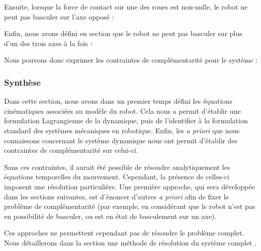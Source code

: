 				Ensuite, lorsque la force de contact sur une des roues est non-nulle, le robot ne peut pas basculer sur l'axe opposé :
				
				Enfin, nous avons défini en section  que le robot ne peut pas basculer sur plus d'un des trois axes à la fois :
				
				Nous pouvons donc exprimer les contraintes de complémentarité pour le système :
				
			\subsubsection{Synthèse}
			
				Dans cette section, nous avons dans un premier temps défini les équations cinématiques associées au modèle du robot.
				Cela nous a permit d'établir une formulation Lagrangienne de la dynamique, puis de l'identifier à la formulation standard des systèmes mécaniques en robotique.
				Enfin, les \textit{a priori} que nous connaissons concernant le système dynamique nous ont permit d'établir des contraintes de complémentarité sur celui-ci.
				
				
				
				Sans ces contraintes, il aurait été possible de résoudre analytiquement les équations temporelles du mouvement. Cependant, la présence de celles-ci imposent une résolution particulière.
				Une première approche, qui sera développée dans les sections suivantes, est d'énoncer d'autres \textit{a priori} afin de fixer le problème de complémentarité
				(par exemple, en considérant que le robot n'est pas en possibilité de basculer, ou est en état de basculement sur un axe). 
				
				Ces approches ne permettent cependant pas de résoudre le problème complet. 
				Nous détaillerons dans la section  une méthode de résolution du système complet .
		
